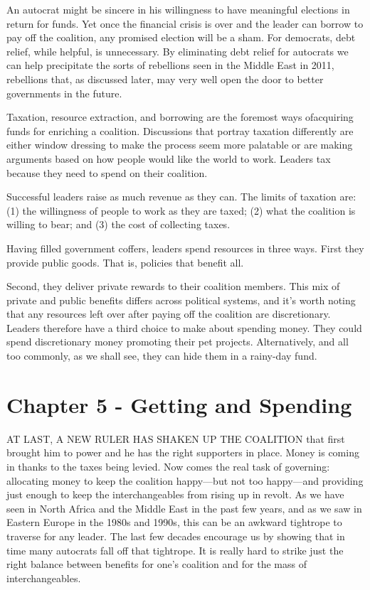 \documentclass[10pt]{article}
\begin{document}
{\large An autocrat might be sincere in his willingness to have meaningful
elections in return for funds. Yet once the financial crisis is over and the
leader can borrow to pay off the coalition, any promised election will be a sham.
For democrats, debt relief, while helpful, is unnecessary. By eliminating debt
relief for autocrats we can help precipitate the sorts of rebellions seen in the
Middle East in 2011, rebellions that, as discussed later, may very well open the
door to better governments in the future.}

{\large Taxation, resource extraction, and borrowing are the foremost ways
ofacquiring funds for enriching a coalition. Discussions that portray taxation
differently are either window dressing to make the process seem more palatable or
are making arguments based on how people would like the world to work. Leaders
tax because they need to spend on their coalition.}

{\large Successful leaders raise as much revenue as they can. The limits of
taxation are: (1) the willingness of people to work as they are taxed; (2) what
the coalition is willing to bear; and (3) the cost of collecting taxes.}

{\large Having filled government coffers, leaders spend resources in three ways.
First they provide public goods. That is, policies that benefit all.}

{\large Second, they deliver private rewards to their coalition members. This
mix of private and public benefits differs across political systems, and it's
worth noting that any resources left over after paying off the coalition are
discretionary. Leaders therefore have a third choice to make about spending
money. They could spend discretionary money promoting their pet projects.
Alternatively, and all too commonly, as we shall see, they can hide them in a
rainy-day fund.}
\pagebreak{}


\section{Chapter 5 - Getting and Spending}

{\large AT LAST, A NEW RULER HAS SHAKEN UP THE COALITION that first brought him
to power and he has the right supporters in place. Money is coming in thanks to
the taxes being levied. Now comes the real task of governing: allocating money to
keep the coalition happy---but not too happy---and providing just enough to keep
the interchangeables from rising up in revolt. As we have seen in North Africa
and the Middle East in the past few years, and as we saw in Eastern Europe in the
1980s and 1990s, this can be an awkward tightrope to traverse for any leader. The
last few decades encourage us by showing that in time many autocrats fall off
that tightrope. It is really hard to strike just the right balance between
benefits for one's coalition and for the mass of interchangeables.}
\end{document}
